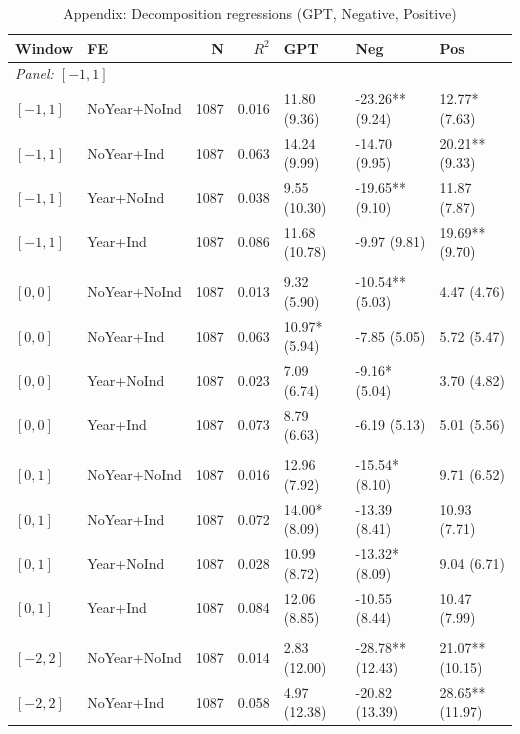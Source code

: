 \begin{table}[p]
\centering
\caption{Appendix: Decomposition regressions (GPT, Negative, Positive)}
\label{tab:app_decomp}
\scriptsize
\setlength{\tabcolsep}{4pt}
\renewcommand{\arraystretch}{1.1}
\begin{tabular}{l l r r l l l}
\toprule
Window & FE & N & $R^{2}$ & GPT & Neg & Pos \\
\midrule
\multicolumn{7}{l}{\textit{Panel: $[-1,1]$}} \\
\addlinespace[1pt]
$[-1,1]$ & NoYear+NoInd & 1087 & 0.016 & 11.80 (9.36) & -23.26** (9.24) & 12.77* (7.63) \\
$[-1,1]$ & NoYear+Ind & 1087 & 0.063 & 14.24 (9.99) & -14.70 (9.95) & 20.21** (9.33) \\
$[-1,1]$ & Year+NoInd & 1087 & 0.038 & 9.55 (10.30) & -19.65** (9.10) & 11.87 (7.87) \\
$[-1,1]$ & Year+Ind & 1087 & 0.086 & 11.68 (10.78) & -9.97 (9.81) & 19.69** (9.70) \\
\addlinespace[2pt]
\multicolumn{7}{l}{\textit{Panel: $[0,0]$}} \\
\addlinespace[1pt]
$[0,0]$ & NoYear+NoInd & 1087 & 0.013 & 9.32 (5.90) & -10.54** (5.03) & 4.47 (4.76) \\
$[0,0]$ & NoYear+Ind & 1087 & 0.063 & 10.97* (5.94) & -7.85 (5.05) & 5.72 (5.47) \\
$[0,0]$ & Year+NoInd & 1087 & 0.023 & 7.09 (6.74) & -9.16* (5.04) & 3.70 (4.82) \\
$[0,0]$ & Year+Ind & 1087 & 0.073 & 8.79 (6.63) & -6.19 (5.13) & 5.01 (5.56) \\
\addlinespace[2pt]
\multicolumn{7}{l}{\textit{Panel: $[0,1]$}} \\
\addlinespace[1pt]
$[0,1]$ & NoYear+NoInd & 1087 & 0.016 & 12.96 (7.92) & -15.54* (8.10) & 9.71 (6.52) \\
$[0,1]$ & NoYear+Ind & 1087 & 0.072 & 14.00* (8.09) & -13.39 (8.41) & 10.93 (7.71) \\
$[0,1]$ & Year+NoInd & 1087 & 0.028 & 10.99 (8.72) & -13.32* (8.09) & 9.04 (6.71) \\
$[0,1]$ & Year+Ind & 1087 & 0.084 & 12.06 (8.85) & -10.55 (8.44) & 10.47 (7.99) \\
\addlinespace[2pt]
\multicolumn{7}{l}{\textit{Panel: $[-2,2]$}} \\
\addlinespace[1pt]
$[-2,2]$ & NoYear+NoInd & 1087 & 0.014 & 2.83 (12.00) & -28.78** (12.43) & 21.07** (10.15) \\
$[-2,2]$ & NoYear+Ind & 1087 & 0.058 & 4.97 (12.38) & -20.82 (13.39) & 28.65** (11.97) \\

\end{tabular}
\end{table}
